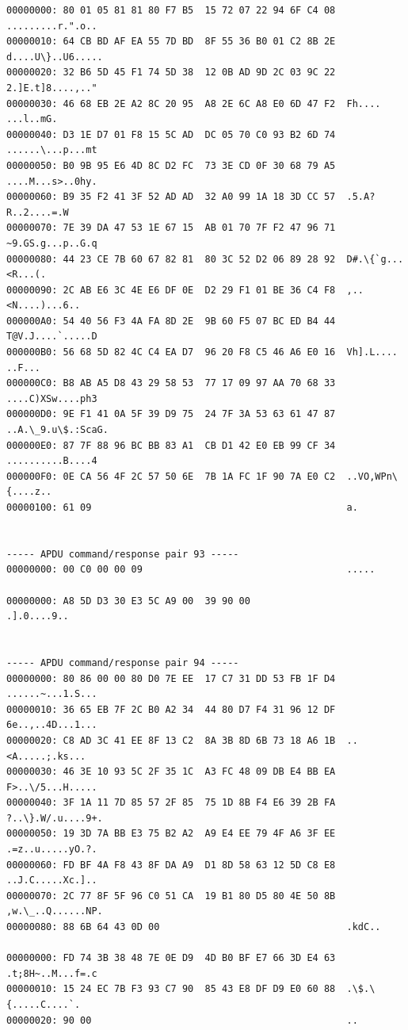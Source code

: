 \documentclass[bsc,frontabs,twoside,singlespacing,parskip,deptreport]{infthesis}     %
\begin{document}
\begin{appendices}
\begin{Verbatim}[commandchars=\\\{\}, fontsize=\small]
00000000: 80 01 05 81 81 80 F7 B5  15 72 07 22 94 6F C4 08  .........r.".o..
00000010: 64 CB BD AF EA 55 7D BD  8F 55 36 B0 01 C2 8B 2E  d....U\}..U6.....
00000020: 32 B6 5D 45 F1 74 5D 38  12 0B AD 9D 2C 03 9C 22  2.]E.t]8....,.."
00000030: 46 68 EB 2E A2 8C 20 95  A8 2E 6C A8 E0 6D 47 F2  Fh.... ...l..mG.
00000040: D3 1E D7 01 F8 15 5C AD  DC 05 70 C0 93 B2 6D 74  ......\...p...mt
00000050: B0 9B 95 E6 4D 8C D2 FC  73 3E CD 0F 30 68 79 A5  ....M...s>..0hy.
00000060: B9 35 F2 41 3F 52 AD AD  32 A0 99 1A 18 3D CC 57  .5.A?R..2....=.W
00000070: 7E 39 DA 47 53 1E 67 15  AB 01 70 7F F2 47 96 71  ~9.GS.g...p..G.q
00000080: 44 23 CE 7B 60 67 82 81  80 3C 52 D2 06 89 28 92  D#.\{`g...<R...(.
00000090: 2C AB E6 3C 4E E6 DF 0E  D2 29 F1 01 BE 36 C4 F8  ,..<N....)...6..
000000A0: 54 40 56 F3 4A FA 8D 2E  9B 60 F5 07 BC ED B4 44  T@V.J....`.....D
000000B0: 56 68 5D 82 4C C4 EA D7  96 20 F8 C5 46 A6 E0 16  Vh].L.... ..F...
000000C0: B8 AB A5 D8 43 29 58 53  77 17 09 97 AA 70 68 33  ....C)XSw....ph3
000000D0: 9E F1 41 0A 5F 39 D9 75  24 7F 3A 53 63 61 47 87  ..A.\_9.u\$.:ScaG.
000000E0: 87 7F 88 96 BC BB 83 A1  CB D1 42 E0 EB 99 CF 34  ..........B....4
000000F0: 0E CA 56 4F 2C 57 50 6E  7B 1A FC 1F 90 7A E0 C2  ..VO,WPn\{....z..
00000100: 61 09                                             a.


----- APDU command/response pair 93 -----
00000000: 00 C0 00 00 09                                    .....

00000000: A8 5D D3 30 E3 5C A9 00  39 90 00                 .].0....9..


----- APDU command/response pair 94 -----
00000000: 80 86 00 00 80 D0 7E EE  17 C7 31 DD 53 FB 1F D4  ......~...1.S...
00000010: 36 65 EB 7F 2C B0 A2 34  44 80 D7 F4 31 96 12 DF  6e..,..4D...1...
00000020: C8 AD 3C 41 EE 8F 13 C2  8A 3B 8D 6B 73 18 A6 1B  ..<A.....;.ks...
00000030: 46 3E 10 93 5C 2F 35 1C  A3 FC 48 09 DB E4 BB EA  F>..\/5...H.....
00000040: 3F 1A 11 7D 85 57 2F 85  75 1D 8B F4 E6 39 2B FA  ?..\}.W/.u....9+.
00000050: 19 3D 7A BB E3 75 B2 A2  A9 E4 EE 79 4F A6 3F EE  .=z..u.....yO.?.
00000060: FD BF 4A F8 43 8F DA A9  D1 8D 58 63 12 5D C8 E8  ..J.C.....Xc.]..
00000070: 2C 77 8F 5F 96 C0 51 CA  19 B1 80 D5 80 4E 50 8B  ,w.\_..Q......NP.
00000080: 88 6B 64 43 0D 00                                 .kdC..

00000000: FD 74 3B 38 48 7E 0E D9  4D B0 BF E7 66 3D E4 63  .t;8H~..M...f=.c
00000010: 15 24 EC 7B F3 93 C7 90  85 43 E8 DF D9 E0 60 88  .\$.\{.....C....`.
00000020: 90 00                                             ..



\end{Verbatim}
\end{appendices}
\end{document}
